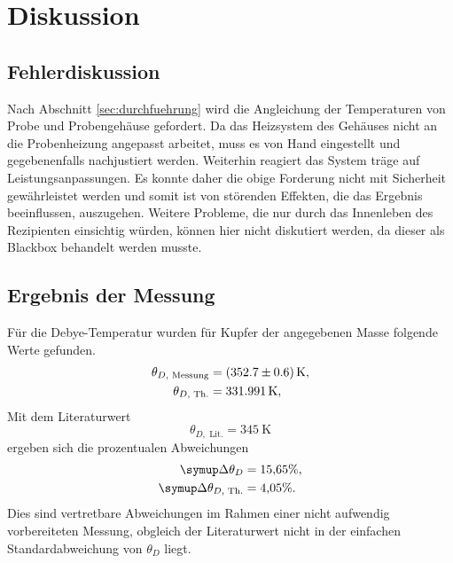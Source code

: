 \section{Diskussion}
\label{sec:Diskussion}

\subsection{Fehlerdiskussion}
Nach Abschnitt \ref{sec:durchfuehrung} wird die Angleichung der Temperaturen von Probe und Probengehäuse gefordert.
Da das Heizsystem des Gehäuses nicht an die Probenheizung angepasst arbeitet, 
muss es von Hand eingestellt und gegebenenfalls nachjustiert werden.
Weiterhin reagiert das System träge auf Leistungsanpassungen. 
Es konnte daher die obige Forderung nicht mit Sicherheit gewährleistet werden und 
somit ist von störenden Effekten, die das Ergebnis beeinflussen, auszugehen.
Weitere Probleme, 
die nur durch das Innenleben des Rezipienten einsichtig würden, können hier nicht diskutiert werden, 
da dieser als Blackbox behandelt werden musste.

\subsection{Ergebnis der Messung}
Für die Debye-Temperatur wurden für Kupfer der angegebenen Masse folgende Werte gefunden. 
\begin{align}
	\theta_{D,\text{ Messung}} &= \SI{352.7\pm0.6}{\kelvin},\\
	\theta_{D,\text{ Th.}} &= \SI{331.991}{\kelvin},
\end{align}
Mit dem Literaturwert \cite{debye-kupfer}
\begin{equation}
	\theta_{D,\text{ Lit.}} = \SI{345}{\kelvin}
\end{equation}
ergeben sich die prozentualen Abweichungen
\begin{align}
	\symup\Delta\theta_D &= 15{,}65 \%,\\
	\symup\Delta\theta_{D,\text{ Th.}} &= 4{,}05 \%.
\end{align}
Dies sind vertretbare Abweichungen im Rahmen einer nicht aufwendig vorbereiteten Messung, 
obgleich der Literaturwert nicht in der einfachen Standardabweichung von $\theta_D$ liegt.

